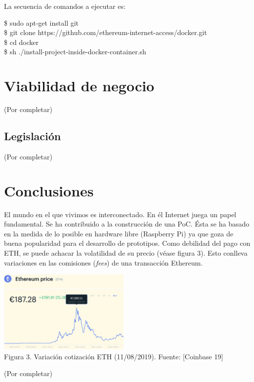 \documentclass[12pt]{amsart}
\begin{document}
\begin{multicols}{2}
La secuencia de comandos a ejecutar es:
\\
\begin{flushleft}
\$ sudo apt-get install git
\\
\$ git clone https://github.com/ethereum-internet-access/docker.git
\\
\$ cd docker
\\
\$ sh ./install-project-inside-docker-container.sh
\end{flushleft}
\section{Viabilidad de negocio}\label{sec:business}
(Por completar)
\subsection{Legislación} \label{ch:legislation}
(Por completar)
\section{Conclusiones}\label{sec:conclusions}
El mundo en el que vivimos es interconectado.
En él Internet juega un papel fundamental.
Se ha contribuido a la construcción de
una PoC. Ésta se ha basado en la medida de
lo posible en hardware libre
(Raspberry Pi) ya que goza de buena popularidad
para el desarrollo de prototipos.
Como debilidad del pago con ETH, se puede
achacar la volatilidad de su precio (véase figura 3).
Esto conlleva variaciones en
las comisiones (\textit{fees}) de una transacción Ethereum.
\begin{center}
  \includegraphics[keepaspectratio, width=0.481125\textwidth]{images/ethcurrentprice-sourcecoinbase.eps}
\\
Figura 3. Variación cotización ETH (11/08/2019). Fuente: [Coinbase 19]
\\
\end{center}
(Por completar)

\end{multicols}
\end{document}
